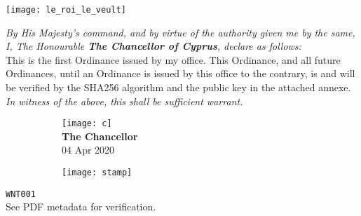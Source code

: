\documentclass[varwidth=true,border=50pt]{standalone}
\begin{document}
\noindent \texttt{[image: le\_roi\_le\_veult]}

\vspace{10pt}

\textit{By His Majesty's command, and by virtue of the authority given me by the same, I, The Honourable \textbf{The Chancellor of Cyprus}, declare as follows:}\\

This is the first Ordinance issued by my office. This Ordinance, and all future Ordinances, until an Ordinance is issued by this office to the contrary, is and will be verified by the SHA256 algorithm and the public key in the attached annexe.\\

\textit{In witness of the above, this shall be sufficient warrant.}

\vspace{20pt}

\begin{figure}
\centering
\begin{subfigure}{.5\textwidth}
    \centering
    \texttt{[image: c]}\\
    \vspace{5pt}
    \textbf{The Chancellor}\\
    04 Apr 2020
\end{subfigure}%
\begin{subfigure}{.5\textwidth}
    \centering
    \texttt{[image: stamp]}
\end{subfigure}%
\end{figure}

\vspace{30pt}

\hfill {\footnotesize \texttt{WNT001}}\\

{\tiny See PDF metadata for verification.}
\end{document}
